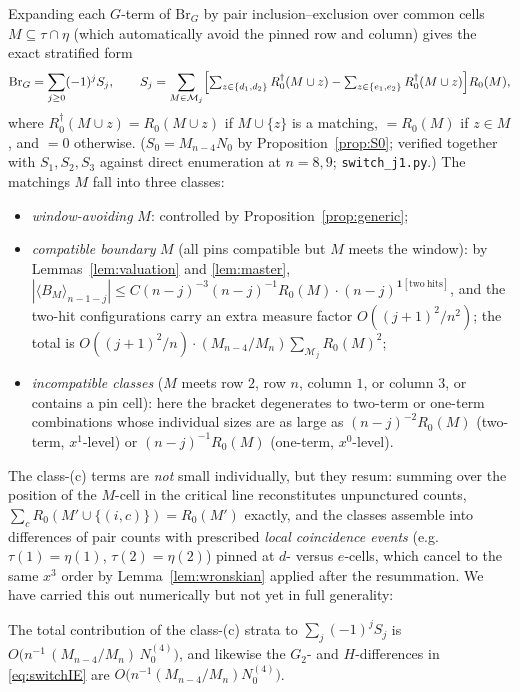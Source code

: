 Expanding each $G$-term of $\mathrm{Br}_G$ by pair inclusion--exclusion
over common cells $M\subseteq\tau\cap\eta$ (which automatically avoid the
pinned row and column) gives the exact stratified form
\begin{equation}\label{eq:strata}
\mathrm{Br}_G=\sum_{j\ge0}(-1)^j S_j,\qquad
S_j=\sum_{M\in\mathcal M_j}\Bigl[\textstyle\sum_{z\in\{d_1,d_2\}}
R_0^\dagger(M\cup z)-\sum_{z\in\{e_1,e_2\}}R_0^\dagger(M\cup z)\Bigr]R_0(M),
\end{equation}
where $R_0^\dagger(M\cup z)=R_0(M\cup z)$ if $M\cup\{z\}$ is a matching,
$=R_0(M)$ if $z\in M$, and $=0$ otherwise.  ($S_0=M_{n-4}N_0$ by
Proposition~\ref{prop:S0}; verified together with $S_1,S_2,S_3$ against
direct enumeration at $n=8,9$; \texttt{switch\_j1.py}.)
The matchings $M$ fall into three classes:
\begin{itemize}[leftmargin=2em]
\item[\textup{(a)}] \emph{window-avoiding} $M$: controlled by
Proposition~\ref{prop:generic};
\item[\textup{(b)}] \emph{compatible boundary} $M$ (all pins compatible
but $M$ meets the window): by Lemmas~\ref{lem:valuation} and
\ref{lem:master}, $|\langle B_M\rangle_{n-1-j}|\le
C(n-j)^{-3}(n-j)^{-1}R_0(M)\cdot(n-j)^{\mathbf 1[\mathrm{two\ hits}]}$,
and the two-hit configurations carry an extra measure factor
$O((j+1)^2/n^2)$; the total is $O((j{+}1)^2/n)\cdot
(M_{n-4}/M_n)\sum_{\mathcal M_j}R_0(M)^2$;
\item[\textup{(c)}] \emph{incompatible classes} ($M$ meets row $2$, row
$n$, column $1$, or column $3$, or contains a pin cell): here the bracket
degenerates to two-term or one-term combinations whose individual sizes
are as large as $(n-j)^{-2}R_0(M)$ (two-term, $x^1$-level) or
$(n-j)^{-1}R_0(M)$ (one-term, $x^0$-level).
\end{itemize}

The class-(c) terms are \emph{not} small individually, but they resum:
summing over the position of the $M$-cell in the critical line
reconstitutes unpunctured counts,
$\sum_{c}R_0(M'\cup\{(i,c)\})=R_0(M')$ exactly, and the classes assemble
into differences of pair counts with prescribed \emph{local coincidence
events} (e.g.\ $\tau(1)=\eta(1)$, $\tau(2)=\eta(2)$) pinned at $d$- versus
$e$-cells, which cancel to the same $x^3$ order by
Lemma~\ref{lem:wronskian} applied after the resummation.  We have carried
this out numerically but not yet in full generality:

\begin{lemma}\label{lem:boundary}
The total contribution of the class-(c) strata to
$\sum_j(-1)^jS_j$ is $O\bigl(n^{-1}\,(M_{n-4}/M_n)\,N^{(4)}_0\bigr)$,
and likewise the $G_2$- and $H$-differences in \eqref{eq:switchIE} are
$O\bigl(n^{-1}(M_{n-4}/M_n)N^{(4)}_0\bigr)$.
\end{lemma}

